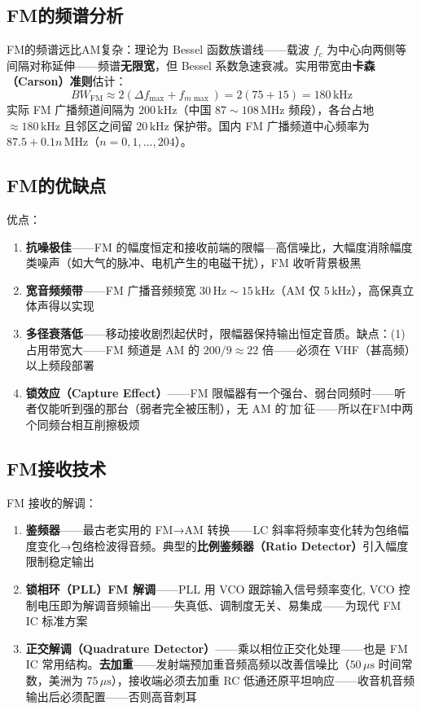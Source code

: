 \documentclass[12pt,UTF8]{ctexbook}
\begin{document}
\subsection{FM的频谱分析}

FM的频谱远比AM复杂：理论为 Bessel 函数族谱线——载波 $f_c$ 为中心向两侧等间隔对称延伸——频谱\textbf{无限宽}，但 Bessel 系数急速衰减。实用带宽由\textbf{卡森（Carson）准则}估计：
\[
BW_{\text{FM}} \approx 2(\Delta f_{\max} + f_{m\max}) = 2(75+15) = 180\,\mathrm{kHz}
\]
实际 FM 广播频道间隔为 $200\,\mathrm{kHz}$（中国 $87\sim108\,\mathrm{MHz}$ 频段），各台占地 $\approx 180\,\mathrm{kHz}$ 且邻区之间留 $20\,\mathrm{kHz}$ 保护带。国内 FM 广播频道中心频率为 $87.5 + 0.1n\,\mathrm{MHz}$（$n=0,1,\ldots,204$）。

\subsection{FM的优缺点}

优点：
\begin{enumerate}
\item \textbf{抗噪极佳}——FM 的幅度恒定和接收前端的限幅—高信噪比，大幅度消除幅度类噪声（如大气的脉冲、电机产生的电磁干扰），FM 收听背景极黑
\item \textbf{宽音频频带}——FM 广播音频频宽 $30\,\mathrm{Hz}\sim15\,\mathrm{kHz}$（AM 仅 $5\,\mathrm{kHz}$），高保真立体声得以实现
\item \textbf{多径衰落低}——移动接收剧烈起伏时，限幅器保持输出恒定音质。缺点：(1) 占用带宽大——FM 频道是 AM 的 $200/9\approx 22$ 倍——必须在 VHF（甚高频）以上频段部署
\item \textbf{锁效应（Capture Effect）}——FM 限幅器有一个强台、弱台同频时——听者仅能听到强的那台（弱者完全被压制），无 AM 的\"叠加\"特征——所以在FM中两个同频台相互削擦极烦
\end{enumerate}

\subsection{FM接收技术}

FM 接收的解调：
\begin{enumerate}
\item \textbf{鉴频器}——最古老实用的 FM→AM 转换——LC 斜率将频率变化转为包络幅度变化→包络检波得音频。典型的\textbf{比例鉴频器（Ratio Detector）}引入幅度限制稳定输出
\item \textbf{锁相环（PLL）FM 解调}——PLL 用 VCO 跟踪输入信号频率变化, VCO 控制电压即为解调音频输出——失真低、调制度无关、易集成——为现代 FM IC 标准方案
\item \textbf{正交解调（Quadrature Detector）}——乘以相位正交化处理——也是 FM IC 常用结构。\textbf{去加重}——发射端预加重音频高频以改善信噪比（$50\,\mu\mathrm{s}$ 时间常数，美洲为 $75\,\mu\mathrm{s}$），接收端必须去加重 RC 低通还原平坦响应——收音机音频输出后必须配置——否则高音刺耳
\end{enumerate}
\end{document}
